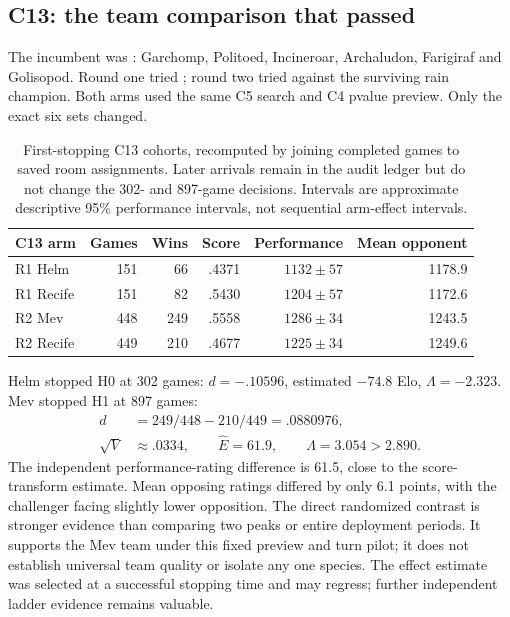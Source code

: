 \subsection{C13: the team comparison that passed}
The incumbent was : Garchomp, Politoed,
Incineroar, Archaludon, Farigiraf and Golisopod. Round one tried
; round two tried
 against the surviving rain champion. Both arms
used the same C5 search and C4 pvalue preview. Only the exact six sets changed.

\begin{table}[htbp]
\centering\small
\begin{tabular}{lrrrrr}
\toprule
C13 arm & Games & Wins & Score & Performance & Mean opponent \\
\midrule
R1 Helm & 151 & 66 & .4371 & $1132\pm57$ & 1178.9 \\
R1 Recife & 151 & 82 & .5430 & $1204\pm57$ & 1172.6 \\
\midrule
R2 Mev & 448 & 249 & .5558 & $1286\pm34$ & 1243.5 \\
R2 Recife & 449 & 210 & .4677 & $1225\pm34$ & 1249.6 \\
\bottomrule
\end{tabular}
\caption{First-stopping C13 cohorts, recomputed by joining completed games to
saved room assignments. Later arrivals remain in the audit ledger but do not
change the 302- and 897-game decisions. Intervals are approximate descriptive
95\% performance intervals, not sequential arm-effect intervals.}
\label{tab:c13-arms}
\end{table}

Helm stopped H0 at 302 games: $d=-.10596$, estimated $-74.8$ Elo,
$\Lambda=-2.323$. Mev stopped H1 at 897 games:
\begin{align*}
 d&=249/448-210/449=.0880976,\\
 \sqrt V&\approx.0334,\qquad \widehat E=61.9,\qquad \Lambda=3.054>2.890.
\end{align*}
The independent performance-rating difference is 61.5, close to the
score-transform estimate. Mean opposing ratings differed by only 6.1 points,
with the challenger facing slightly lower opposition. The direct randomized
contrast is stronger evidence than comparing two peaks or entire deployment
periods. It supports the Mev team under this fixed preview and turn pilot;
it does not establish universal team quality or isolate any one species.
The effect estimate was selected at a successful stopping time and may
regress; further independent ladder evidence remains valuable.

